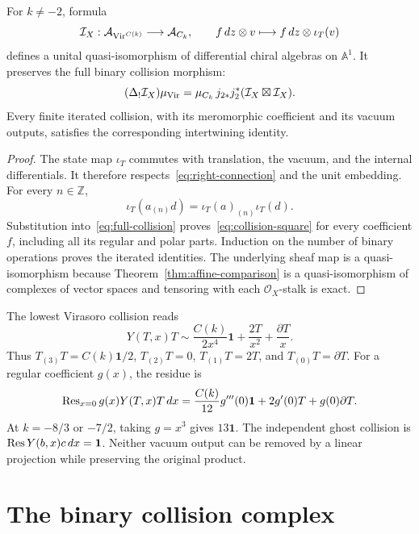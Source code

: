 \begin{theorem}\label{thm:chiral-chart}
For $k\neq-2$, formula
\begin{equation}\label{eq:sheaf-map}
 \mathcal I_X:\mathcal A_{\operatorname{Vir}^{C(k)}}\longrightarrow\mathcal A_{C_k},
 \qquad f\,dz\otimes v\longmapsto f\,dz\otimes\iota_T(v)
\end{equation}
defines a unital quasi-isomorphism of differential chiral algebras on $\mathbb A^1$.
It preserves the full binary collision morphism:
\begin{equation}\label{eq:collision-square}
 (\Delta_!\mathcal I_X)\mu_{\operatorname{Vir}}
 =\mu_{C_k}\,j_{2*}j_2^*(\mathcal I_X\boxtimes\mathcal I_X).
\end{equation}
Every finite iterated collision, with its meromorphic coefficient and its vacuum outputs, satisfies the corresponding intertwining identity.
\end{theorem}
\begin{proof}
The state map $\iota_T$ commutes with translation, the vacuum, and the internal differentials.
It therefore respects~\eqref{eq:right-connection} and the unit embedding.
For every $n\in\mathbb Z$,
\[
 \iota_T(a_{(n)}d)=\iota_T(a)_{(n)}\iota_T(d).
\]
Substitution into~\eqref{eq:full-collision} proves~\eqref{eq:collision-square} for every coefficient $f$, including all its regular and polar parts.
Induction on the number of binary operations proves the iterated identities.
The underlying sheaf map is a quasi-isomorphism because Theorem~\ref{thm:affine-comparison} is a quasi-isomorphism of complexes of vector spaces and tensoring with each $\mathcal O_X$-stalk is exact.
\end{proof}

The lowest Virasoro collision reads
\begin{equation}\label{eq:TT-ope}
 Y(T,x)T\sim\frac{C(k)}{2x^4}\mathbf1
       +\frac{2T}{x^2}+\frac{\partial T}{x}.
\end{equation}
Thus $T_{(3)}T=C(k)\mathbf1/2$, $T_{(2)}T=0$, $T_{(1)}T=2T$, and $T_{(0)}T=\partial T$.
For a regular coefficient $g(x)$, the residue is
\[
 \operatorname{Res}_{x=0}g(x)Y(T,x)T\,dx
 =\frac{C(k)}{12}g'''(0)\mathbf1+2g'(0)T+g(0)\partial T.
\]
At $k=-8/3$ or $-7/2$, taking $g=x^3$ gives $13\mathbf1$.
The independent ghost collision is $\operatorname{Res} Y(b,x)c\,dx=\mathbf1$.
Neither vacuum output can be removed by a linear projection while preserving the original product.

\section{The binary collision complex}

